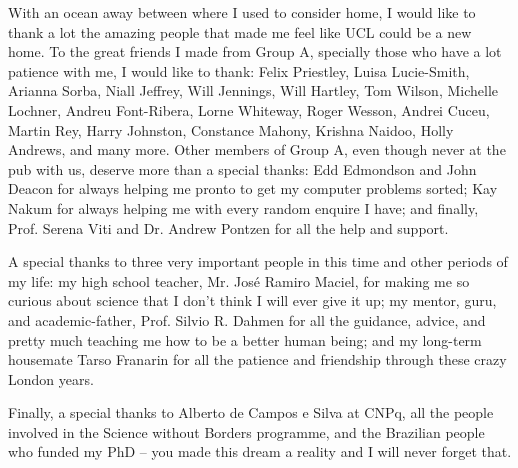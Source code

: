 \qquad With an ocean away between where I used to consider home, I would like to thank a lot the amazing people that made me feel like UCL could be a new home. To the great friends I made from Group A, specially those who have a lot patience with me, I would like to thank: Felix Priestley, Luisa Lucie-Smith, Arianna Sorba, Niall Jeffrey, Will Jennings, Will Hartley, Tom Wilson, Michelle Lochner, Andreu Font-Ribera, Lorne Whiteway, Roger Wesson, Andrei Cuceu, Martin Rey, Harry Johnston, Constance Mahony, Krishna Naidoo, Holly Andrews, and many more. Other members of Group A, even though never at the pub with us, deserve more than a special thanks: Edd Edmondson and John Deacon for always helping me pronto to get my computer problems sorted; Kay Nakum for always helping me with every random enquire I have; and finally, Prof. Serena Viti and Dr. Andrew Pontzen for all the help and support. 

\qquad A special thanks to three very important people in this time and other periods of my life: my high school teacher, Mr. Jos\'e Ramiro Maciel, for making me so curious about science that I don't think I will ever give it up; my mentor, guru, and academic-father, Prof. Silvio R. Dahmen for all the guidance, advice, and pretty much teaching me how to be a better human being; and my long-term housemate Tarso Franarin for all the patience and friendship through these crazy London years.

\qquad Finally, a special thanks to Alberto de Campos e Silva at CNPq, all the people involved in the Science without Borders programme, and the Brazilian people who funded my PhD -- you made this dream a reality and I will never forget that.